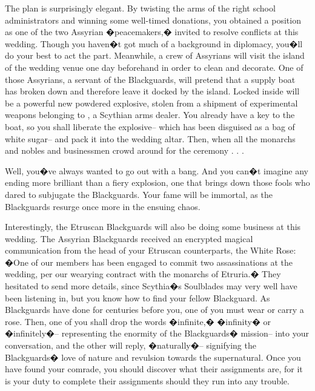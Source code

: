 \documentclass[char]{Kos}
\begin{document}
The plan is surprisingly elegant. By twisting the arms of the right school administrators and winning some well-timed donations, you obtained a position as one of the two Assyrian �peacemakers,� invited to resolve conflicts at this wedding. Though you haven�t got much of a background in diplomacy, you�ll do your best to act the part. Meanwhile, a crew of Assyrians will visit the island of the wedding venue one day beforehand in order to clean and decorate. One of those Assyrians, a servant of the Blackguards, will pretend that a supply boat has broken down and therefore leave it docked by the island. Locked inside will be a powerful new powdered explosive, stolen from a shipment of experimental weapons belonging to \cArmsDealer{\name}, a Scythian arms dealer. You already have a key to the boat, so you shall liberate the explosive-- which has been disguised as a bag of white sugar-- and pack it into the wedding altar. Then, when all the monarchs and nobles and businessmen crowd around for the ceremony . . .

Well, you�ve always wanted to go out with a bang. And you can�t imagine any ending more brilliant than a fiery explosion, one that brings down those fools who dared to subjugate the Blackguards. Your fame will be immortal, as the Blackguards resurge once more in the ensuing chaos.

Interestingly, the Etruscan Blackguards will also be doing some business at this wedding. The Assyrian Blackguards received an encrypted magical communication from the head of your Etruscan counterparts, the White Rose: �One of our members has been engaged to commit two assassinations at the wedding, per our wearying contract with the monarchs of Etruria.� They hesitated to send more details, since Scythia�s Soulblades may very well have been listening in, but you know how to find your fellow Blackguard. As Blackguards have done for centuries before you, one of you must wear or carry a rose. Then, one of you shall drop the words �infinite,� �infinity� or �infinitely�-- representing the enormity of the Blackguards� mission-- into your conversation, and the other will reply, �naturally�-- signifying the Blackguards� love of nature and revulsion towards the supernatural. Once you have found your comrade, you should discover what their assignments are, for it is your duty to complete their assignments should they run into any trouble.
\end{document}
